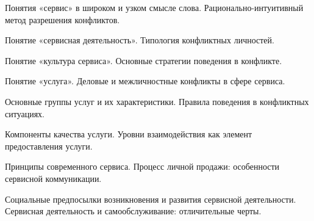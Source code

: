 \documentclass[
	14pt,
	a4paper,
	]
	{scrartcl}
\begin{document}
\shapk
{}
\setcounter{zad}{0}

\vfill
\z Понятия «сервис» в широком и узком смысле слова.
 \vfill
\z Рационально-интуитивный метод разрешения конфликтов. \vfill

\vfill

\newpage


\shapk
{}
\setcounter{zad}{0}

\vfill
\z Понятие «сервисная деятельность».
 \vfill
\z Типология конфликтных личностей.
 \vfill

\vfill

\newpage


\shapk
{}
\setcounter{zad}{0}

\vfill
\z Понятие «культура сервиса».
 \vfill
\z Основные стратегии поведения в конфликте.
 \vfill

\vfill

\newpage


\shapk
{}
\setcounter{zad}{0}

\vfill
\z Понятие «услуга».
 \vfill
\z Деловые и межличностные конфликты в сфере сервиса.
 \vfill

\vfill

\newpage


\shapk
{}
\setcounter{zad}{0}

\vfill
\z Основные группы услуг и их характеристики.
 \vfill
\z Правила поведения в конфликтных ситуациях.
 \vfill

\vfill

\newpage


\shapk
{}
\setcounter{zad}{0}

\vfill
\z Компоненты качества услуги.
 \vfill
\z Уровни взаимодействия как элемент предоставления услуги.
 \vfill

\vfill

\newpage


\shapk
{}
\setcounter{zad}{0}

\vfill
\z Принципы современного сервиса.
 \vfill
\z Процесс личной продажи: особенности сервисной коммуникации.
 \vfill

\vfill

\newpage


\shapk
{}
\setcounter{zad}{0}

\vfill
\z Социальные предпосылки возникновения и развития сервисной деятельности.
 \vfill
\z Сервисная деятельность и самообслуживание: отличительные черты.
 \vfill
\end{document}
